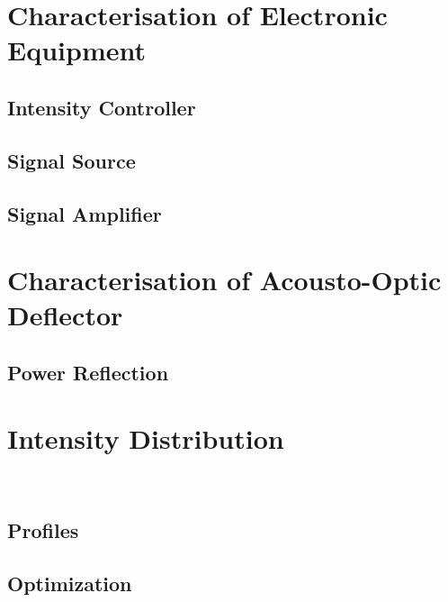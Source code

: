 \chapter{Characterisation of Electronic Equipment}




\section{Intensity Controller}
\section{Signal Source}
\section{Signal Amplifier}


\chapter{Characterisation of Acousto-Optic Deflector}

\section{Power Reflection}

\chapter{Intensity Distribution}
\
\section{Profiles}
\section{Optimization}
